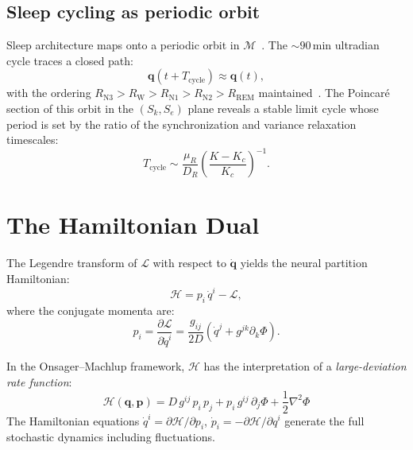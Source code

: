 \documentclass[twocolumn,aps,prl,superscriptaddress,floatfix]{revtex4-2}
\newcommand{\Lag}{\mathcal{L}}
\newcommand{\Ham}{\mathcal{H}}
\newcommand{\Pot}{\Phi}
\newcommand{\Sk}{S_k}
\newcommand{\Se}{S_e}
\newcommand{\qvec}{\mathbf{q}}
\newcommand{\Kc}{K_c}
\begin{document}
\subsection{Sleep cycling as periodic orbit}

Sleep architecture maps onto a periodic orbit in $\mathcal{M}$~\cite{sachikonye2026regime}.
The ${\sim}90$\,min ultradian cycle traces a closed path:
\begin{equation}
\qvec(t + T_{\mathrm{cycle}}) \approx \qvec(t),
\end{equation}
with the ordering $R_{\mathrm{N3}} > R_{\mathrm{W}} > R_{\mathrm{N1}} > R_{\mathrm{N2}} > R_{\mathrm{REM}}$ maintained~\cite{sachikonye2026regime}.
The Poincar\'e section of this orbit in the $(\Sk, \Se)$ plane reveals a stable limit cycle whose period is set by the ratio of the synchronization and variance relaxation timescales:
\begin{equation}
T_{\mathrm{cycle}} \sim \frac{\mu_R}{D_R}\left(\frac{K - \Kc}{\Kc}\right)^{-1}.
\end{equation}


\section{The Hamiltonian Dual}
\label{sec:hamiltonian}

The Legendre transform of $\Lag$ with respect to $\dot{\qvec}$ yields the neural partition Hamiltonian:
\begin{equation}
\Ham = p_i\,\dot{q}^i - \Lag,
\end{equation}
where the conjugate momenta are:
\begin{equation}
p_i = \frac{\partial\Lag}{\partial\dot{q}^i} = \frac{g_{ij}}{2D}\left(\dot{q}^j + g^{jk}\partial_k\Pot\right).
\end{equation}

In the Onsager--Machlup framework, $\Ham$ has the interpretation of a \emph{large-deviation rate function}:
\begin{equation}
\boxed{
\Ham(\qvec, \mathbf{p}) = D\,g^{ij}\,p_i\,p_j + p_i\,g^{ij}\,\partial_j\Pot + \frac{1}{2}\nabla^2\Pot
}
\label{eq:hamiltonian}
\end{equation}
The Hamiltonian equations $\dot{q}^i = \partial\Ham/\partial p_i$, $\dot{p}_i = -\partial\Ham/\partial q^i$ generate the full stochastic dynamics including fluctuations.
\end{document}
